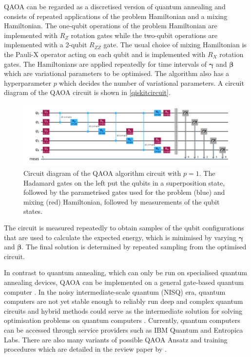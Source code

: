 QAOA can be regarded as a discretised version of quantum annealing \cite{qaoareview} and consists of repeated applications of the problem Hamiltonian and a mixing Hamiltonian. The one-qubit operations of the problem Hamiltonian are implemented with $R_Z$ rotation gates while the two-qubit operations are implemented with a 2-qubit $R_{ZZ}$ gate. The usual choice of mixing Hamiltonian is the Pauli-X operator acting on each qubit and is implemented with $R_X$ rotation gates. The Hamiltonians are applied repeatedly for time intervals of $\boldsymbol{\gamma}$ and $\boldsymbol{\beta}$ which are variational parameters to be optimised. The algorithm also has a hyperparameter $p$ which decides the number of variational parameters. A circuit diagram of the QAOA circuit is shown in \autoref{qiskitcircuit}. 
\begin{figure}[htb!]
    \centering
    \includegraphics[width=\linewidth]{images/qaoanewcircuit.png}
    \caption{Circuit diagram of the QAOA algorithm circuit with $p=1$. The Hadamard gates on the left put the qubits in a superposition state, followed by the parametrised gates used for the problem (blue) and mixing (red) Hamiltonian, followed by measurements of the qubit states.}
    \label{qiskitcircuit}
\end{figure}

The circuit is measured repeatedly to obtain samples of the qubit configurations that are used to calculate the expected energy, which is minimised by varying $\boldsymbol{\gamma}$ and $\boldsymbol{\beta}$. The final solution is determined by repeated sampling from the optimised circuit.

In contrast to quantum annealing, which can only be run on specialised quantum annealing devices, QAOA can be implemented on a general gate-based quantum computer . In the noisy intermediate-scale quantum (NISQ) era, quantum computers are not yet stable enough to reliably run deep and complex quantum circuits and hybrid methods could serve as the intermediate solution for solving optimisation problems on quantum computers \cite{qaoareview}. Currently, quantum computers can be accessed through service providers such as IBM Quantum and Entropica Labs. There are also many variants of possible QAOA Ansatz and training procedures which are detailed in the review paper by .